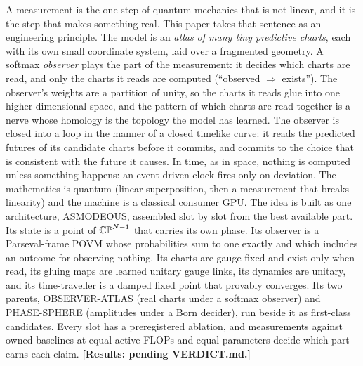 A measurement is the one step of quantum mechanics that is not linear, and it is the step that makes something real. This paper takes that sentence as an engineering principle. The model is an \emph{atlas of many tiny predictive charts}, each with its own small coordinate system, laid over a fragmented geometry. A softmax \emph{observer} plays the part of the measurement: it decides which charts are read, and only the charts it reads are computed (``observed $\Rightarrow$ exists''). The observer's weights are a partition of unity, so the charts it reads glue into one higher-dimensional space, and the pattern of which charts are read together is a nerve whose homology is the topology the model has learned. The observer is closed into a loop in the manner of a closed timelike curve: it reads the predicted futures of its candidate charts before it commits, and commits to the choice that is consistent with the future it causes. In time, as in space, nothing is computed unless something happens: an event-driven clock fires only on deviation. The mathematics is quantum (linear superposition, then a measurement that breaks linearity) and the machine is a classical consumer GPU. The idea is built as one architecture, ASMODEOUS, assembled slot by slot from the best available part. Its state is a point of $\mathbb{CP}^{N-1}$ that carries its own phase. Its observer is a Parseval-frame POVM whose probabilities sum to one exactly and which includes an outcome for observing nothing. Its charts are gauge-fixed and exist only when read, its gluing maps are learned unitary gauge links, its dynamics are unitary, and its time-traveller is a damped fixed point that provably converges. Its two parents, OBSERVER-ATLAS (real charts under a softmax observer) and PHASE-SPHERE (amplitudes under a Born decider), run beside it as first-class candidates. Every slot has a preregistered ablation, and measurements against owned baselines at equal active FLOPs and equal parameters decide which part earns each claim. \textbf{[Results: pending VERDICT.md.]}

